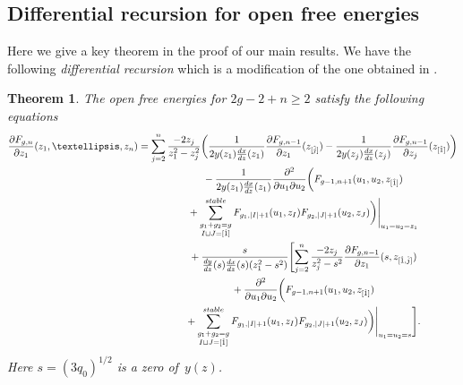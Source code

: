 \documentclass[11pt]{article}
\newtheorem{thm}{Theorem}[section]
\theoremstyle{definition}
\numberwithin{equation}{section}
\def\p{\partial}
\begin{document}
\subsection{Dif\/ferential recursion for open free energies}

Here we give a key theorem in the proof of our main results.
We have the following {\em differential recursion} which is
a modif\/ication of the one obtained in \cite{DM14, DM14-2}.

\begin{thm} \label{thm:diff-rec}
The open free energies for $2g-2+n \ge 2$ satisfy
the following equations
\begin{gather}
\frac{\p F_{g,n}}{\p z_{1}}(z_{1},\dots,z_{n}) =
\sum_{j=2}^{n} \frac{-2z_{j}}{z_{1}^{2}-z_{j}^{2}}
\biggl( \frac{1}{2y(z_{1})\frac{dx}{dz}(z_{1})}
\frac{\p F_{g,n-1}}{\p z_{1}}(z_{[\hat{j}]})
 - \frac{1}{2y(z_{j})\frac{dx}{dz}(z_{j})}
\frac{\p F_{g,n-1}}{\p z_{j}}(z_{[\hat{1}]}) \biggr)
\nonumber\\
\hphantom{\frac{\p F_{g,n}}{\p z_{1}}(z_{1},\dots,z_{n}) =}{}
- \frac{1}{2y(z_{1})\frac{dx}{dz}(z_{1})} \frac{\p^{2}}{\p u_{1} \p u_{2}}
\biggl( F_{g-1,n+1}(u_{1},u_{2},z_{[\hat{1}]}) \nonumber\\
\hphantom{\frac{\p F_{g,n}}{\p z_{1}}(z_{1},\dots,z_{n}) =}{}
+
\sum_{\substack{g_{1}+g_{2}=g \\ I \sqcup J = [\hat{1}]}}^{\rm stable}
F_{g_{1}, |I|+1}(u_{1},z_{I}) F_{g_{2}, |J|+1}(u_{2}, z_{J})
\biggr)\Biggr|_{u_{1}=u_{2}=z_{1}}
\nonumber\\
\hphantom{\frac{\p F_{g,n}}{\p z_{1}}(z_{1},\dots,z_{n}) =}{}
+ \frac{s}{\frac{dy}{dz}(s) \frac{dx}{dz}(s)(z_{1}^{2}-s^{2})}
\Biggl[ \sum_{j=2}^{n} \frac{-2 z_{j}}{z_{j}^{2}-s^{2}}
\frac{\p F_{g,n-1}}{\p z_{1}}(s,z_{[\hat{1}, \hat{j}]})
\nonumber\\
\hphantom{\frac{\p F_{g,n}}{\p z_{1}}(z_{1},\dots,z_{n}) =}{}
+ \frac{\p^{2}}{\p u_{1} \p u_{2}}
\biggl( F_{g-1,n+1}(u_{1},u_{2},z_{[\hat{1}]})\nonumber\\
\hphantom{\frac{\p F_{g,n}}{\p z_{1}}(z_{1},\dots,z_{n}) =}{}
 +
\sum_{\substack{g_{1}+g_{2}=g \\
I \sqcup J = [\hat{1}]}}^{\rm stable}
F_{g_{1}, |I|+1}(u_{1},z_{I}) F_{g_{2}, |J|+1}(u_{2}, z_{J})
\biggr)\Biggr|_{u_{1}=u_{2}=s} \Biggr].\label{eq:diff-rec}
\end{gather}
Here
$s = (3q_{0})^{1/2}$
is a zero of~$y(z)$.
\end{thm}
\end{document}
